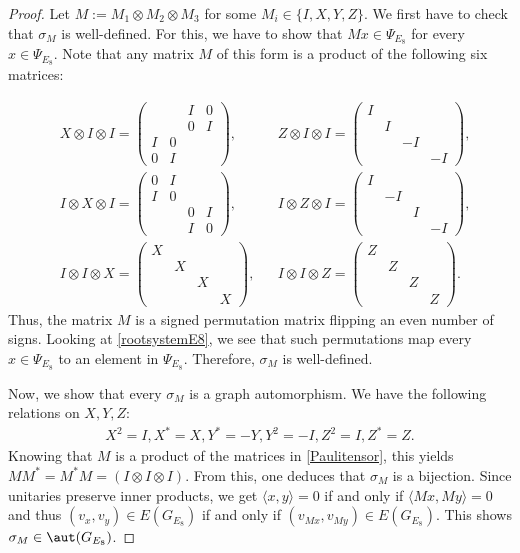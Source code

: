 \begin{proof}
Let $M:=M_1\otimes M_2 \otimes M_3$ for some $M_i \in \{I,X,Y,Z\}$. We first have to check that $\sigma_M$ is well-defined. For this, we have to show that $Mx\in \Psi_{E_8}$ for every $x \in \Psi_{E_8}$. Note that any matrix $M$ of this form is a product of the following six matrices:

\begin{align}
&X\otimes I\otimes I=\begin{pmatrix}&&I&0\\&&0&I\\I&0&&\\0&I&&\end{pmatrix}, 
&&Z\otimes I\otimes I=\begin{pmatrix}I&&&\\&I&&\\&&-I&\\&&&-I\end{pmatrix},\nonumber\\
&I\otimes X\otimes I=\begin{pmatrix}0&I&&\\I&0&&\\&&0&I\\&&I&0\end{pmatrix},
&&I\otimes Z\otimes I=\begin{pmatrix}I&&&\\&-I&&\\&&I&\\&&&-I\end{pmatrix}
,\nonumber\\
&I\otimes I\otimes X=\begin{pmatrix}X&&&\\&X&&\\&&X&\\&&&X\end{pmatrix},
&&I\otimes I\otimes Z=\begin{pmatrix}Z&&&\\&Z&&\\&&Z&\\&&&Z\end{pmatrix}.\label{Paulitensor}
\end{align}
Thus, the matrix $M$ is a signed permutation matrix flipping an even number of signs. Looking at \eqref{rootsystemE8}, we see that such permutations map every $x\in\Psi_{E_8}$ to an element in $\Psi_{E_8}$. Therefore, $\sigma_M$ is well-defined.

Now, we show that every $\sigma_M$ is a graph automorphism. We have the following relations on $X,Y,Z$:
\begin{align*}
    X^2=I, X^*=X, Y^*=-Y, Y^2=-I, Z^2=I, Z^*=Z.
\end{align*}
Knowing that $M$ is a product of the matrices in \eqref{Paulitensor}, this yields $MM^*=M^*M=(I\otimes I\otimes I)$. From this, one deduces that $\sigma_M$ is a bijection. Since unitaries preserve inner products, we get $\langle x,y\rangle=0$ if and only if $\langle Mx,My \rangle=0$ and thus $(v_x,v_y)\in E(G_{E_8})$ if and only if $(v_{Mx}, v_{My})\in E(G_{E_8})$. This shows $\sigma_M\in \aut(G_{E_8})$.


\end{proof}
